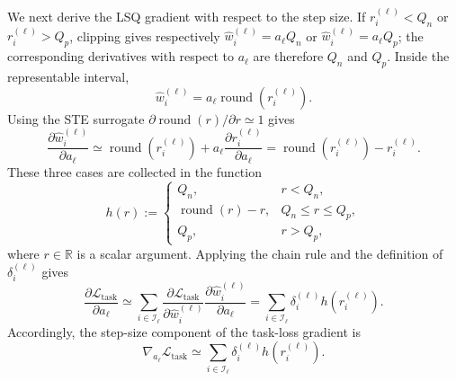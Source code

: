 \documentclass{article}
\begin{document}
We next derive the LSQ gradient with respect to the step size. If
$r_i^{(\ell)}<Q_n$ or $r_i^{(\ell)}>Q_p$, clipping gives respectively
$\widehat w_i^{(\ell)}=a_\ell Q_n$ or
$\widehat w_i^{(\ell)}=a_\ell Q_p$; the corresponding derivatives with
respect to $a_\ell$ are therefore $Q_n$ and $Q_p$. Inside the representable
interval,
\[
  \widehat w_i^{(\ell)}
  =a_\ell\operatorname{round}(r_i^{(\ell)}).
\]
Using the STE surrogate
$\partial\operatorname{round}(r)/\partial r\simeq1$ gives
\[
  \frac{\partial\widehat w_i^{(\ell)}}{\partial a_\ell}
  \simeq
  \operatorname{round}(r_i^{(\ell)})
  +a_\ell\frac{\partial r_i^{(\ell)}}{\partial a_\ell}
  =\operatorname{round}(r_i^{(\ell)})-r_i^{(\ell)}.
\]
These three cases are collected in the function
\begin{equation}
  h(r)
  :=
  \begin{cases}
    Q_n, & r<Q_n,\\
    \operatorname{round}(r)-r, & Q_n\leq r\leq Q_p,\\
    Q_p, & r>Q_p,
  \end{cases}
  \label{eq:lsq-h}
\end{equation}
where $r\in\mathbb R$ is a scalar argument. Applying the chain rule and the
definition of $\delta_i^{(\ell)}$ gives
\[
  \frac{\partial\mathcal L_{\mathrm{task}}}{\partial a_\ell}
  \simeq
  \sum_{i\in\mathcal I_\ell}
  \frac{\partial\mathcal L_{\mathrm{task}}}
       {\partial\widehat w_i^{(\ell)}}
  \frac{\partial\widehat w_i^{(\ell)}}{\partial a_\ell}
  =
  \sum_{i\in\mathcal I_\ell}
  \delta_i^{(\ell)}h(r_i^{(\ell)}).
\]
Accordingly, the step-size component of the task-loss gradient is
\begin{equation}
  \nabla_{a_\ell}\mathcal L_{\mathrm{task}}
  \simeq
  \sum_{i\in\mathcal I_\ell}
  \delta_i^{(\ell)}h(r_i^{(\ell)}).
  \label{eq:task-scale-gradient}
\end{equation}
\end{document}
